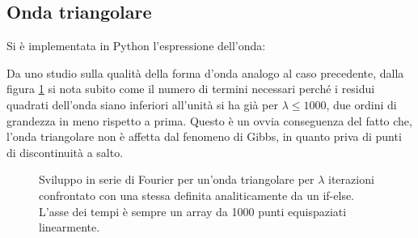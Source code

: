 \documentclass{article}[a4paper, oneside ,11pt]
\begin{document}
\subsection{Onda triangolare}
Si è implementata in Python l'espressione dell'onda: 

Da uno studio sulla qualità della forma d'onda analogo al caso precedente, dalla figura \ref{plt:trg} si nota subito come il numero di termini necessari perché i residui quadrati dell'onda siano inferiori all'unità si ha già per $\lambda \leq 1000$, due ordini di grandezza in meno rispetto a prima. Questo è un ovvia conseguenza del fatto che, l'onda triangolare non è affetta dal fenomeno di Gibbs, in quanto priva di punti di discontinuità a salto.
\begin{figure}[!htb]
	\scalebox{0.55}{}\hfill \scalebox{0.55}{}
	\scalebox{0.55}{}\hfill \scalebox{0.55}{}
 	\caption{Sviluppo in serie di Fourier per un’onda triangolare per $\lambda$ iterazioni confrontato con una stessa definita analiticamente da un if-else. L'asse dei tempi è sempre un array da 1000 punti equispaziati linearmente. \label{plt:trg}}
\end{figure}

\end{document}
